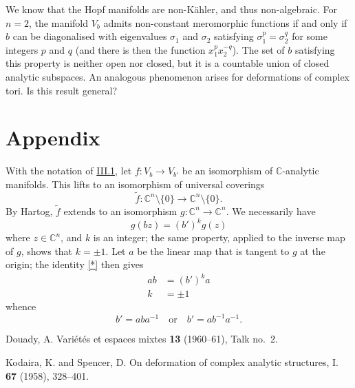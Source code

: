 \documentclass{article}
\theoremstyle{plain}
\theoremstyle{definition}
\newcommand{\CC}{\mathbb{C}}
\begin{document}
We know that the Hopf manifolds are non-K\"{a}hler, and thus non-algebraic.
For $n=2$, the manifold $V_b$ admits non-constant meromorphic functions if and only if $b$ can be diagonalised with eigenvalues $\sigma_1$ and $\sigma_2$ satisfying $\sigma_1^p=\sigma_2^q$ for some integers $p$ and $q$ (and there is then the function $x_1^px_2^{-q}$).
The set of $b$ satisfying this property is neither open nor closed, but it is a countable union of closed analytic subspaces.
An analogous phenomenon arises for deformations of complex tori.
Is this result general?


\appendix
{}
\section*{Appendix}
\label{appendix}

With the notation of \hyperref[III.1]{III.1}, let $f\colon V_b\to V_{b'}$ be an isomorphism of $\CC$-analytic manifolds.
This lifts to an isomorphism of universal coverings
\[
  \widetilde{f}\colon \CC^n\setminus\{0\} \to \CC^n\setminus\{0\}.
\]
By Hartog, $\widetilde{f}$ extends to an isomorphism $g\colon\CC^n\to\CC^n$.
We necessarily have
\[
\label{*}
  g(bz) = (b')^kg(z)
\tag{$*$}
\]
where $z\in\CC^n$, and $k$ is an integer;
the same property, applied to the inverse map of $g$, shows that $k=\pm1$.
Let $a$ be the linear map that is tangent to $g$ at the origin;
the identity \cref{*} then gives
\[
  \begin{aligned}
    ab &= (b')^ka
  \\k &= \pm1
  \end{aligned}
\]
whence
\[
  b' = aba^{-1}
  \quad\text{or}\quad
  b'= ab^{-1}a^{-1}.
\]






\nocite{*}

\begin{thebibliography}{2}

  {\sc Douady, A.}
  \newblock Vari\'{e}t\'{e}s et espaces mixtes
   \textbf{13} (1960--61), Talk no.~2.

  {\sc Kodaira, K. and Spencer, D.}
  \newblock On deformation of complex analytic structures, I.
   \textbf{67} (1958), 328--401.

\end{thebibliography}
\end{document}
